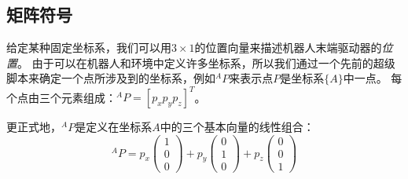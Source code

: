 \subsection{矩阵符号}


给定某种固定坐标系，我们可以用$ 3\times 1 $的位置向量来描述机器人末端驱动器的\emph {位置}。 由于可以在机器人和环境中定义许多坐标系，所以我们通过一个先前的超级脚本来确定一个点所涉及到的坐标系，例如$ ^AP $来表示点$ P $是坐标系$\{A\}$中一点。 每个点由三个元素组成：$ ^AP = [p_x p_y p_z]^T $。

更正式地，$ ^ AP $是定义在坐标系$A$中的三个基本向量的线性组合：
\begin{equation}
^AP=p_x\left(\begin{array}{c}1\\0\\0\end{array}\right)+p_y\left(\begin{array}{c}0\\1\\0\end{array}\right)+p_z\left(\begin{array}{c}0\\0\\1\end{array}\right)\label{eq:basis}
\end{equation}



